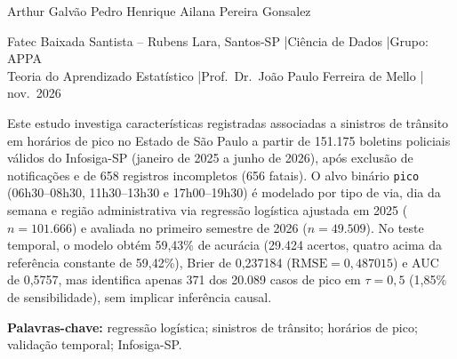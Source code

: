 \documentclass[
  article,
  12pt,
  oneside,
  a4paper,
  section=TITLE,
  english,
  brazil
]{abntex2}\usepackage[]{graphicx}\usepackage[]{xcolor}
\begin{document}
\frenchspacing
\pagestyle{abntchapfirst}
\thispagestyle{abntchapfirst}

\begin{SingleSpace}
\begin{center}
  {\normalsize\bfseries\imprimirtitulo\par}
  \vspace{0.18em}
  {\normalsize\itshape\imprimirtituloestrangeiro\par}
  \vspace{0.3em}
  {\normalsize
    Arthur Galvão\footnotemark[1] \quad
    Pedro Henrique\footnotemark[1] \quad
    Ailana Pereira Gonsalez\footnotemark[1]\par}
  \vspace{0.18em}
  {\footnotesize
    Fatec Baixada Santista -- Rubens Lara, Santos-SP \quad|\quad Ciência de Dados \quad|\quad Grupo: APPA \\
    Teoria do Aprendizado Estatístico \quad|\quad Prof.\ Dr.\ João Paulo Ferreira de Mello \quad| nov.\ 2026%
  \par}
\end{center}
\end{SingleSpace}


\vspace{0.15em}

\begin{SingleSpace}
\noindent{}

\vspace{0.12em}
\noindent Este estudo investiga características registradas associadas a sinistros de trânsito em horários de pico no Estado de São Paulo a partir de 151.175 boletins policiais válidos do Infosiga-SP (janeiro de 2025 a junho de 2026), após exclusão de notificações e de 658 registros incompletos (656 fatais). O alvo binário \texttt{pico} (06h30--08h30, 11h30--13h30 e 17h00--19h30) é modelado por tipo de via, dia da semana e região administrativa via regressão logística ajustada em 2025 ($n = 101.666$) e avaliada no primeiro semestre de 2026 ($n = 49.509$). No teste temporal, o modelo obtém 59,43\% de acurácia (29.424 acertos, quatro acima da referência constante de 59,42\%), Brier de 0,237184 ($\mathrm{RMSE} = 0{,}487015$) e AUC de 0,5757, mas identifica apenas 371 dos 20.089 casos de pico em $\tau = 0{,}5$ (1,85\% de sensibilidade), sem implicar inferência causal.\par

\vspace{0.12em}
\noindent\textbf{Palavras-chave:} regressão logística; sinistros de trânsito; horários de pico; validação temporal; Infosiga-SP.
\end{SingleSpace}
\end{document}
